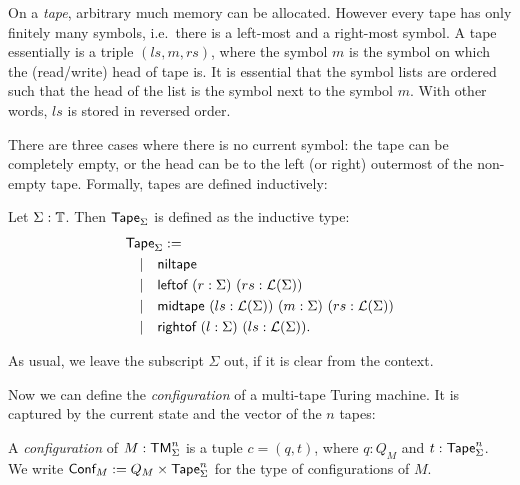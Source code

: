On a \emph{tape}, arbitrary much memory can be allocated.  However every tape has only finitely many symbols, i.e.\ there is a left-most and a
right-most symbol.  A tape essentially is a triple $(ls,m,rs)$, where the symbol $m$ is the symbol on which the (read/write) head of tape is.  It is
essential that the symbol lists are ordered such that the head of the list is the symbol next to the symbol $m$.  With other words, $ls$ is stored in
reversed order.

There are three cases where there is no current symbol: the tape can be completely empty, or the head can be to the left (or right) outermost of the
non-empty tape.  Formally, tapes are defined inductively:

\begin{definition}[Tape]
  \label{def:tape}
  Let $\Sigma : \mathbb{T}$.  Then $\textsf{Tape}_\Sigma$ is defined as the inductive type:
  \begin{align*}
    & \textsf{Tape}_\Sigma := \\
    & \quad | \quad \textsf{niltape} \\
    & \quad | \quad \textsf{leftof}  ~ (r:\Sigma) ~ (rs:\mathcal{L}(\Sigma)) \\
    & \quad | \quad \textsf{midtape} ~ (ls:\mathcal{L}(\Sigma)) ~ (m:\Sigma) ~ (rs:\mathcal{L}(\Sigma)) \\
    & \quad | \quad \textsf{rightof} ~ (l:\Sigma) ~ (ls:\mathcal{L}(\Sigma)).
  \end{align*}
\end{definition}

As usual, we leave the subscript $\Sigma$ out, if it is clear from the context.


Now we can define the \emph{configuration} of a multi-tape Turing machine.  It is captured by the current state and the vector of the $n$ tapes:
\begin{definition}[Configuration]
  \label{def:config}
  A \emph{configuration} of $M: \textsf{TM}_\Sigma^n$ is a tuple $c = (q, t)$, where $q: Q_M$ and $t: \textsf{Tape}_\Sigma^n$.  We write
  $\textsf{Conf}_M := Q_M \times \textsf{Tape}_\Sigma^n$ for the type of configurations of $M$.
\end{definition}

